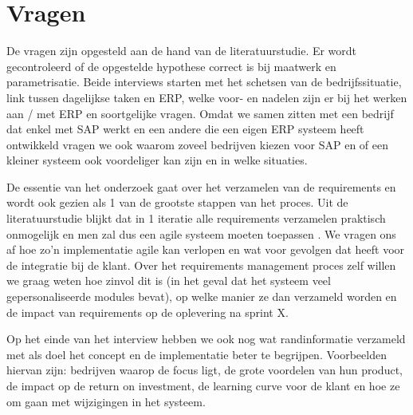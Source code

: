 
\chapter{Vragen}
\label{ch:vraagstelling}

De vragen zijn opgesteld aan de hand van de literatuurstudie. Er wordt gecontroleerd of de opgestelde hypothese correct is bij maatwerk en parametrisatie. Beide interviews starten met het schetsen van de bedrijfssituatie, link tussen dagelijkse taken en ERP, welke voor- en nadelen zijn er bij het werken aan / met ERP en soortgelijke vragen. Omdat we samen zitten met een bedrijf dat enkel met SAP werkt en een andere die een eigen ERP systeem heeft ontwikkeld vragen we ook waarom zoveel bedrijven kiezen voor SAP en of een kleiner systeem ook voordeliger kan zijn en in welke situaties. 

De essentie van het onderzoek gaat over het verzamelen van de requirements en wordt ook gezien als 1 van de grootste stappen van het proces. Uit de literatuurstudie blijkt dat in 1 iteratie alle requirements verzamelen praktisch onmogelijk en men zal dus een agile systeem moeten toepassen \autocite{Vollmer2016}. We vragen ons af hoe zo'n implementatie agile kan verlopen en wat voor gevolgen dat heeft voor de integratie bij de klant. Over het requirements management proces zelf willen we graag weten hoe zinvol dit is (in het geval dat het systeem veel gepersonaliseerde modules bevat), op welke manier ze dan verzameld worden en de impact van requirements op de oplevering na sprint X.

Op het einde van het interview hebben we ook nog wat randinformatie verzameld met als doel het concept en de implementatie beter te begrijpen. Voorbeelden hiervan zijn: bedrijven waarop de focus ligt, de grote voordelen van hun product, de impact op de return on investment, de learning curve voor de klant en hoe ze om gaan met wijzigingen in het systeem.